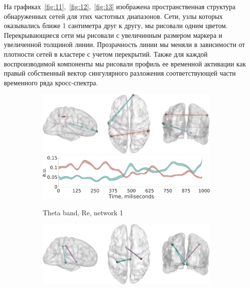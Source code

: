  На графиках~\ref{fig:11},~\ref{fig:12},~\ref{fig:13} изображена пространственная
структура обнаруженных сетей для этих частотных диапазонов. Сети, узлы которых
оказывались ближе 1 сантиметра друг к другу, мы рисовали одним цветом. Перекрывающиеся сети
мы рисовали с увеличинным размером маркера и увеличенной толщиной линии. Прозрачность
линии мы меняли в зависимости от плотности сетей в кластере с учетом перекрытий.
Также для каждой воспроизводимой компоненты мы рисовали профиль ее временной активации
как правый собственный вектор сингулярного разложения соответствующей части временного
ряда кросс-спектра.

\begin{figure}
\centering
{}

 \begin{subfigure}[b]{0.4\textwidth}
 \includegraphics[width=\textwidth]{../images/psiicos_paper/Figure11_a1.jpg}
 \includegraphics[width=\textwidth]{../images/psiicos_paper/Figure11_a2.jpg}
 \caption{Theta band, Re, network 1}\label{fig:11a}
 \end{subfigure}
 \hspace{1cm}
 \begin{subfigure}[b]{0.4\textwidth}
 \includegraphics[width=\textwidth]{../images/psiicos_paper/Figure11_b1.jpg}

\end{subfigure}
\end{figure}

